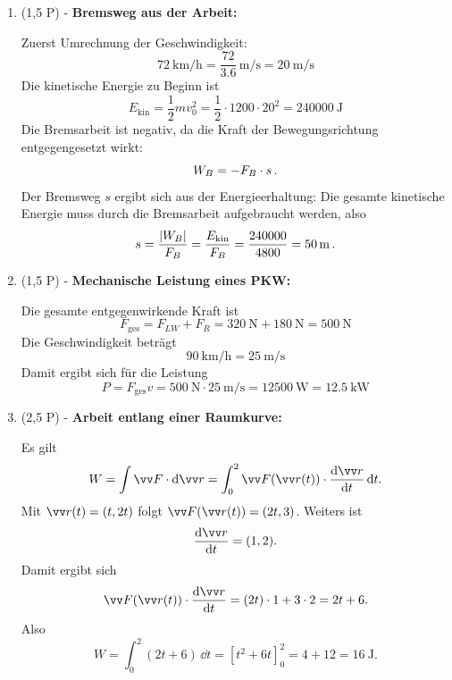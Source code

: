 \documentclass[11pt, a4paper]{article}
\begin{document}
\begin{enumerate}[label=\textbf{\arabic*.},itemsep=0.50cm]
\begin{solutionbox}
\begin{itemize}[itemsep=0pt, topsep=2pt]
            \[
            P = \frac{W_{\text{Hub}}}{t} = \frac{\SI{240}{\joule}}{\SI{10}{\second}} = \SI{24}{\watt}
            \]
        \end{itemize}
    \end{solutionbox}
    \newpage
    \item (1,5 P) - \textbf{Bremsweg aus der Arbeit:}
    \begin{solutionbox}
        Zuerst Umrechnung der Geschwindigkeit:
        \[
        \SI{72}{\kilo\meter\per\hour} = \frac{72}{3.6} \, \si{\meter\per\second} = \SI{20}{\meter\per\second}
        \]
        Die kinetische Energie zu Beginn ist
        \[
        E_{\text{kin}} = \frac{1}{2}mv_0^2 = \frac{1}{2} \cdot 1200 \cdot 20^2 = \SI{240000}{\joule}
        \]
        Die Bremsarbeit ist negativ, da die Kraft der Bewegungsrichtung entgegengesetzt wirkt:
        \[
        W_B = -F_B \cdot s \,.
        \]
        Der Bremsweg $s$ ergibt sich aus der Energieerhaltung: Die gesamte kinetische Energie muss durch die Bremsarbeit aufgebraucht werden, also
        \[
        s = \frac{|W_B|}{F_B} = \frac{E_{\text{kin}}}{F_B} = \frac{240000}{4800} = \SI{50}{\meter} \,.
        \]
    \end{solutionbox}

    \item (1,5 P) - \textbf{Mechanische Leistung eines PKW:}
    \begin{solutionbox}
        Die gesamte entgegenwirkende Kraft ist
        \[
        F_{\text{ges}} = F_{LW} + F_R = \SI{320}{\newton} + \SI{180}{\newton} = \SI{500}{\newton}
        \]
        Die Geschwindigkeit beträgt
        \[
        \SI{90}{\kilo\meter\per\hour} = \SI{25}{\meter\per\second}
        \]
        Damit ergibt sich für die Leistung
        \[
        P = F_{\text{ges}} v = \SI{500}{\newton} \cdot \SI{25}{\meter\per\second} = \SI{12500}{\watt} = \SI{12.5}{\kilo\watt}
        \]
    \end{solutionbox}
    \newpage
    \item (2,5  P) - \textbf{Arbeit entlang einer Raumkurve:}
    \begin{solutionbox}
        Es gilt
        \[
        W = \int \ivec{F}\cdot \dd \ivec{r} = \int_{0}^{2} \ivec{F}(\ivec{r}(t))\cdot \frac{\dd \ivec{r}}{\dd t}\,\dd t.
        \]
        Mit $\ivec{r}(t)=\inlrowTwo{t}{2t}$ folgt $\ivec{F}(\ivec{r}(t))=\inlrowTwo{2t}{3}$.
        Weiters ist
        \[
        \frac{\dd \ivec{r}}{\dd t} = \inlrowTwo{1}{2}.
        \]
        Damit ergibt sich
        \[
        \ivec{F}(\ivec{r}(t))\cdot \frac{\dd \ivec{r}}{\dd t} = (2t)\cdot 1 + 3\cdot 2 = 2t + 6.
        \]
        Also
        \[
        W = \int_{0}^{2} (2t+6)\,\dd t = \left[t^2 + 6t\right]_{0}^{2} = 4 + 12 = \SI{16}{\joule}.
        \]
    \end{solutionbox}


\end{enumerate}
\end{document}
